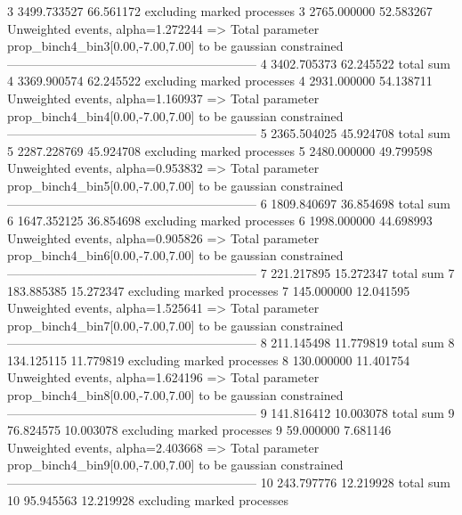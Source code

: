3          3499.733527     66.561172       excluding marked processes    
3          2765.000000     52.583267       Unweighted events, alpha=1.272244
  => Total parameter prop_binch4_bin3[0.00,-7.00,7.00] to be gaussian constrained
------------------------------------------------------------
4          3402.705373     62.245522       total sum                     
4          3369.900574     62.245522       excluding marked processes    
4          2931.000000     54.138711       Unweighted events, alpha=1.160937
  => Total parameter prop_binch4_bin4[0.00,-7.00,7.00] to be gaussian constrained
------------------------------------------------------------
5          2365.504025     45.924708       total sum                     
5          2287.228769     45.924708       excluding marked processes    
5          2480.000000     49.799598       Unweighted events, alpha=0.953832
  => Total parameter prop_binch4_bin5[0.00,-7.00,7.00] to be gaussian constrained
------------------------------------------------------------
6          1809.840697     36.854698       total sum                     
6          1647.352125     36.854698       excluding marked processes    
6          1998.000000     44.698993       Unweighted events, alpha=0.905826
  => Total parameter prop_binch4_bin6[0.00,-7.00,7.00] to be gaussian constrained
------------------------------------------------------------
7          221.217895      15.272347       total sum                     
7          183.885385      15.272347       excluding marked processes    
7          145.000000      12.041595       Unweighted events, alpha=1.525641
  => Total parameter prop_binch4_bin7[0.00,-7.00,7.00] to be gaussian constrained
------------------------------------------------------------
8          211.145498      11.779819       total sum                     
8          134.125115      11.779819       excluding marked processes    
8          130.000000      11.401754       Unweighted events, alpha=1.624196
  => Total parameter prop_binch4_bin8[0.00,-7.00,7.00] to be gaussian constrained
------------------------------------------------------------
9          141.816412      10.003078       total sum                     
9          76.824575       10.003078       excluding marked processes    
9          59.000000       7.681146        Unweighted events, alpha=2.403668
  => Total parameter prop_binch4_bin9[0.00,-7.00,7.00] to be gaussian constrained
------------------------------------------------------------
10         243.797776      12.219928       total sum                     
10         95.945563       12.219928       excluding marked processes    
